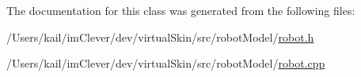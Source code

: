 The documentation for this class was generated from the following files:\begin{DoxyCompactItemize}
\item 
/Users/kail/imClever/dev/virtualSkin/src/robotModel/\hyperlink{robot_8h}{robot.h}\item 
/Users/kail/imClever/dev/virtualSkin/src/robotModel/\hyperlink{robot_8cpp}{robot.cpp}\end{DoxyCompactItemize}
